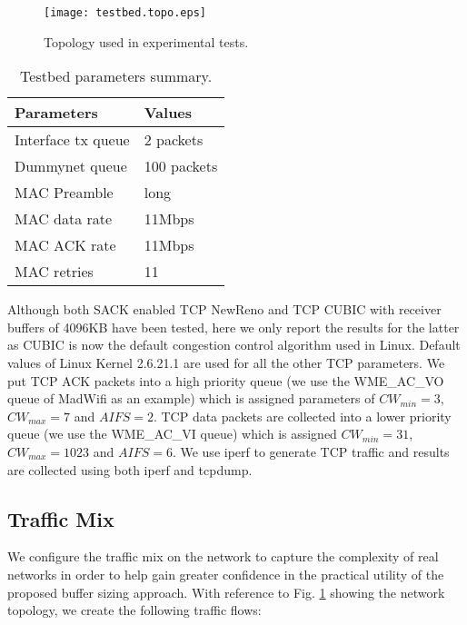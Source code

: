 \documentclass[10pt,twocolumn, journal]{IEEEtran}
\begin{document}
\begin{figure}[tb]
    \centering
    \texttt{[image: testbed.topo.eps]}
    \caption{Topology used in experimental tests.   }
    \label{fig_topo}
\end{figure}

\begin{table}[tb]
    \begin{center}
\begin{tabular}{|l|l|}
            \hline
            \textbf{Parameters}      & \textbf{Values}  \\
            \hline
            Interface tx queue & 2 packets  \\
            \hline
            Dummynet queue     & 100 packets  \\
            \hline
            MAC Preamble  & long \\
            \hline
            MAC data rate  & 11Mbps \\
            \hline
            MAC ACK rate & 11Mbps\\
            \hline
            MAC retries & 11 \\
            \hline
            \end{tabular}
\end{center}
    \caption{Testbed parameters summary.} \label{tab:paramsummary}
\end{table}

Although both SACK enabled TCP NewReno and TCP CUBIC with receiver buffers of 4096KB have been
tested, here we only report the results for the latter as CUBIC is now the default
congestion control algorithm used in Linux.  Default values of Linux Kernel 2.6.21.1 are
used for all the other TCP parameters. We put TCP ACK packets into a high priority queue
(we use the WME\_AC\_VO queue of MadWifi as an example) which is assigned parameters of
$CW_{min}=3$, $CW_{max}=7$ and $AIFS=2$. TCP data packets are collected into a lower
priority queue (we use the WME\_AC\_VI queue) which is assigned $CW_{min}=31$,
$CW_{max}=1023$ and $AIFS=6$. We use iperf to generate TCP traffic and results are
collected using both iperf and tcpdump.

\subsection{Traffic Mix}

We configure the traffic mix on the network to capture the complexity of real networks in
order to help gain greater confidence in the practical utility of the proposed buffer
sizing approach.   With reference to Fig. \ref{fig_topo} showing the network topology, we
create the following traffic flows:
\end{document}
